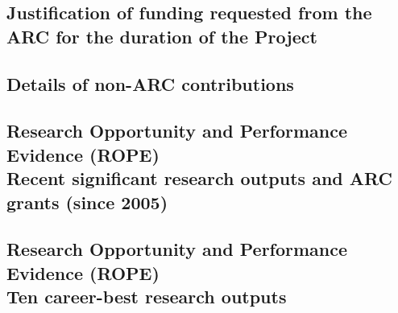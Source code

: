 \documentclass[a4paper,fontsize=12pt]{scrartcl}
\begin{document}
\subsection{Justification of funding requested from the ARC for the
  duration of the Project}
\label{sec:funding-justification}



\newpage
\subsection{Details of non-ARC contributions}
\label{sec:non-arc-contributions}


\newpage
\setcounter{section}{6}
\setcounter{subsection}{11} %
\subsection{Research Opportunity and Performance Evidence (ROPE)\\
  Recent significant research outputs and ARC grants (since 2005)}
\label{sec:recent-significant-outputs}



\newpage
\subsection{Research Opportunity and Performance Evidence (ROPE)\\
  Ten career-best research outputs}
\label{sec:ten-best-outputs}
\end{document}
